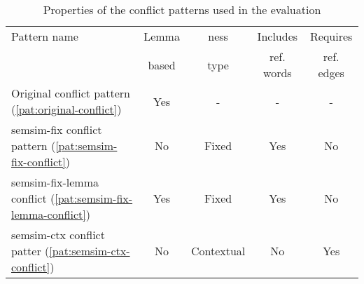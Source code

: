 \documentclass[11pt]{scrreprt}
\begin{document}
{\begin{table}
\centering
\begin{tabular}{lcccc}
\toprule
\multicolumn{1}{l}{Pattern name}		& \multicolumn{1}{c}{Lemma}		& \multicolumn{1}{c}{\gls{ness}}	& \multicolumn{1}{c}{Includes}		& \multicolumn{1}{c}{Requires} \\
\multicolumn{1}{l}{} 				& \multicolumn{1}{c}{based} 		& \multicolumn{1}{c}{type} 		& \multicolumn{1}{c}{ref. words} 	& \multicolumn{1}{c}{ref. edges} \\
\midrule
Original conflict pattern (\ref{pat:original-conflict})					& Yes 		& - 		& -			& - \\
semsim-fix conflict pattern (\ref{pat:semsim-fix-conflict})				& No		& Fixed		& Yes		& No \\
semsim-fix-lemma conflict (\ref{pat:semsim-fix-lemma-conflict}) 		& Yes 		& Fixed		& Yes		& No \\
semsim-ctx conflict patter (\ref{pat:semsim-ctx-conflict})				& No		& Contextual	& No		& Yes \\
\bottomrule
\end{tabular}
\caption{Properties of the conflict patterns used in the evaluation}
\label{tab:evaluation-patterns}
\end{table}


}
\end{document}

